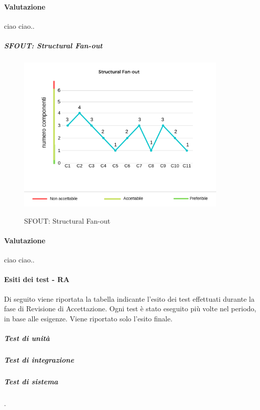 	\paragraph*{Valutazione} ciao ciao..
	\pagebreak
	\subparagraph{SFOUT: Structural Fan-out}
	\begin{center}
		\begin{figure}[h] 
			\centering 
			\includegraphics[width=0.90\textwidth]{res/images/new/sfout.png}\\
			\caption{SFOUT: Structural Fan-out}
		\end{figure}
	\end{center}
	\paragraph*{Valutazione} ciao ciao..
	\pagebreak

\paragraph{Esiti dei test - RA}

Di seguito viene riportata la tabella indicante l'esito dei test effettuati durante la fase di Revisione di Accettazione. Ogni test è stato eseguito più volte nel periodo, in base alle esigenze. Viene riportato solo l'esito finale.

\subparagraph{Test di unità}

\subparagraph{Test di integrazione}

\subparagraph{Test di sistema}
{\color{white}.}
\renewcommand{\arraystretch}{1.5}

